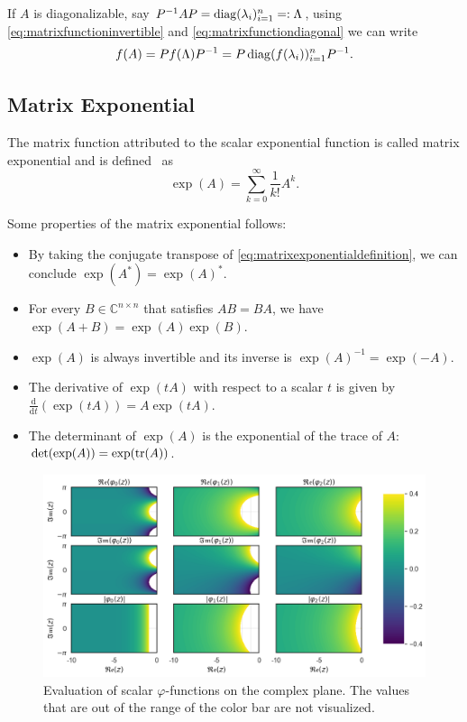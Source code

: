 If $A$ is diagonalizable, say $P^{-1}AP = \operatorname{diag}(\lambda_i)_{i=1}^{n} =: \Lambda$,
using \eqref{eq:matrixfunctioninvertible} and \eqref{eq:matrixfunctiondiagonal}
we can write
\begin{equation}
    f(A) = P f(\Lambda) P^{-1} = P \operatorname{diag}(f(\lambda_i))_{i=1}^{n} P^{-1}.
\end{equation}

\subsection{Matrix Exponential}
The matrix function attributed to the scalar exponential function is called
matrix exponential and is defined~\cite{higham2008functions} as
\begin{equation}
    \label{eq:matrixexponentialdefinition}
    \exp(A) = \sum_{k=0}^{\infty}{\frac{1}{k!} A^k}.
\end{equation}

Some properties of the matrix exponential follows:
\begin{itemize}
    \item By taking the conjugate transpose of \eqref{eq:matrixexponentialdefinition},
        we can conclude $\exp(A^{*}) = \exp(A)^{*}$.
    \item For every $B \in \mathbb{C}^{n \times n}$ that satisfies $AB = BA$,
        we have $\exp(A + B) = \exp(A) \exp(B)$.
    \item $\exp(A)$ is always invertible and its inverse is $\exp(A)^{-1} = \exp(-A)$.
    \item The derivative of $\exp(tA)$ with respect to a scalar $t$ is given by
        $\frac{\mathrm{d}}{\mathrm{d} t} (\exp(tA)) = A \exp(tA)$.
    \item The determinant of $\exp(A)$ is the exponential of the trace of
        $A$: $\det(\exp(A)) = \exp(\trace(A))$.
\end{itemize}

\begin{figure}[h]
    \centering
    \includegraphics[width=.7\textwidth]{img/scalarcomplexplane.png}
    \caption{
        Evaluation of scalar $\varphi$-functions on the complex plane.
        The values that are out of the range of the color bar are not visualized.
        }
    \label{fig:scalarphifunctionscomplexplane}
\end{figure}


